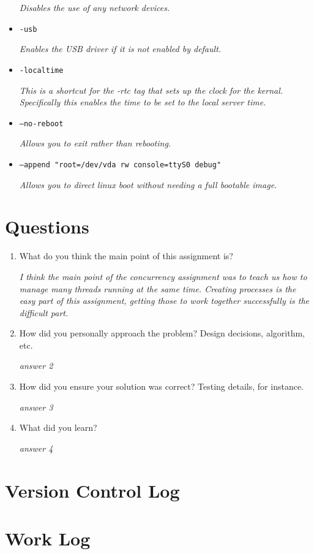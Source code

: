 \documentclass[letterpaper,10pt,titlepage]{article}
\begin{document}
\begin{itemize}
\textsl{Disables the use of any network devices. }
\item{\texttt{-usb}}

\textsl{Enables the USB driver if it is not enabled by default.}
\item{\texttt{-localtime}}

\textsl{This is a shortcut for the -rtc tag that sets up the clock for the 
kernal. Specifically this enables the time to be set to the local server time.}
\item{\texttt{--no-reboot}}

\textsl{Allows you to exit rather than rebooting.}
\item{\texttt{--append "root=/dev/vda rw console=ttyS0 debug"}}

\textsl{Allows you to direct linux boot without needing a full bootable 
image.}

\end{itemize}

\section*{Questions}
\begin{enumerate}
\item{What do you think the main point of this assignment is?}

\textsl{I think the main point of the concurrency assignment was to teach us 
how to manage many threads running at the same time. Creating processes is the 
easy part of this assignment, getting those to work together successfully is the 
difficult part.} 
\item{How did you personally approach the problem? Design decisions, algorithm, 
etc.}

\textsl{answer 2}
\item{How did you ensure your solution was correct? Testing details, for 
instance.}

\textsl{answer 3}
\item{What did you learn?}

\textsl{answer 4}
\end{enumerate}
\section*{Version Control Log}

\section*{Work Log}
 
\end{document}
